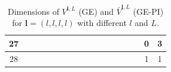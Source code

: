 \documentclass{article}
\newcommand{\bV}{{\bar V}}
\numberwithin{equation}{section}
\def\bl{{\bm l}}
\begin{document}
\begin{table}[htb!]
{\begin{tabular}{|c|cc|cc|cc|cc|cc|cc|cc|cc|}
27 & \multicolumn{1}{c|}{} &  & \multicolumn{1}{c|}{} &  & \multicolumn{1}{c|}{} &  & \multicolumn{1}{c|}{} &  & \multicolumn{1}{c|}{} &  & \multicolumn{1}{c|}{} &  & \multicolumn{1}{c|}{} &  & \multicolumn{1}{c|}{0} & 3 \\ \hline
28 & \multicolumn{1}{c|}{} &  & \multicolumn{1}{c|}{} &  & \multicolumn{1}{c|}{} &  & \multicolumn{1}{c|}{} &  & \multicolumn{1}{c|}{} &  & \multicolumn{1}{c|}{} &  & \multicolumn{1}{c|}{} &  & \multicolumn{1}{c|}{1} & 1 \\ \hline
\end{tabular}%
}
\caption{Dimensions of $V^{\bl,L}$ (GE) and $\bV^{\bl,L}$ (GE-PI) for $\bl=(l,l,l,l)$ with different $l$ and $L$.}
\label{tab:n4}
\end{table}
\end{document}
